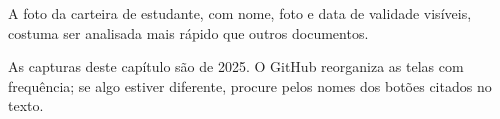 \begin{dica}
A foto da carteira de estudante, com nome, foto e data de validade visíveis,
costuma ser analisada mais rápido que outros documentos.
\end{dica}

\begin{aviso}
As capturas deste capítulo são de 2025. O GitHub reorganiza as telas com
frequência; se algo estiver diferente, procure pelos nomes dos botões citados
no texto.
\end{aviso}
